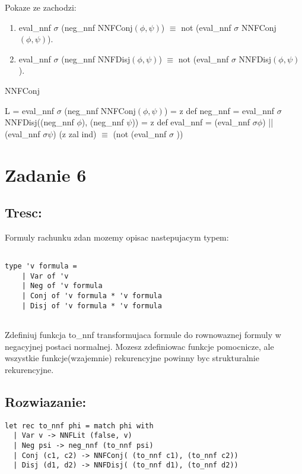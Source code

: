 \documentclass{article}
\begin{document}
Pokaze ze zachodzi:

\begin{enumerate}[label=(\arabic*)]

    \item eval\_nnf $\sigma$ (neg\_nnf NNFConj$(\phi, \psi)$) $\equiv$ not (eval\_nnf $\sigma$ NNFConj$(\phi, \psi)$).
 
    \item eval\_nnf $\sigma$ (neg\_nnf NNFDisj$(\phi, \psi)$) $\equiv$ not (eval\_nnf $\sigma$ NNFDisj$(\phi, \psi)$).  

\end{enumerate}

NNFConj

L =  eval\_nnf $\sigma$ (neg\_nnf NNFConj$(\phi, \psi)$) = z def neg\_nnf = eval\_nnf $\sigma$ NNFDisj((neg\_nnf $\phi$), (neg\_nnf $\psi$)) = z def eval\_nnf = (eval\_nnf $\sigma \phi$) || (eval\_nnf $\sigma \psi$) (z zal ind) $\equiv$ (not (eval\_nnf $\sigma$  ))


\section{Zadanie 6}

\subsection{Tresc:}

Formuly rachunku zdan mozemy opisac nastepujacym typem:

\begin{lstlisting}

type 'v formula = 
    | Var of 'v
    | Neg of 'v formula
    | Conj of 'v formula * 'v formula
    | Disj of 'v formula * 'v formula
    
\end{lstlisting}

Zdefiniuj funkcja to\_nnf transformujaca formule do rownowaznej formuly w negacyjnej postaci normalnej. Mozesz zdefiniowac funkcje pomocnicze, ale wszystkie funkcje(wzajemnie) rekurencyjne powinny byc strukturalnie rekurencyjne.


\subsection{Rozwiazanie:}

\begin{lstlisting}
let rec to_nnf phi = match phi with
  | Var v -> NNFLit (false, v)
  | Neg psi -> neg_nnf (to_nnf psi)
  | Conj (c1, c2) -> NNFConj( (to_nnf c1), (to_nnf c2))
  | Disj (d1, d2) -> NNFDisj( (to_nnf d1), (to_nnf d2))
    
\end{lstlisting}
\end{document}
